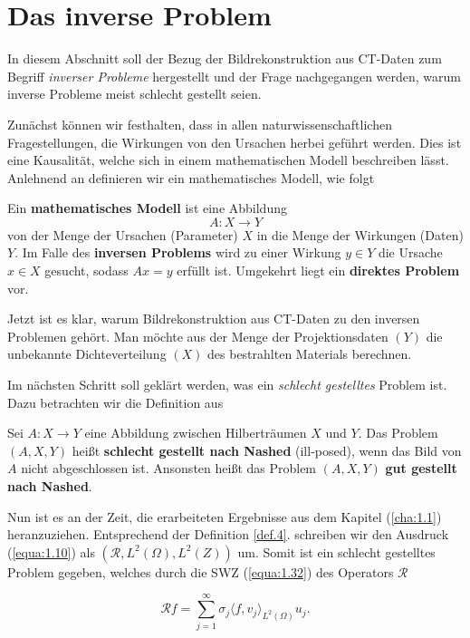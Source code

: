 \chapter{Das inverse Problem}
\label{cha:2}

In diesem Abschnitt soll der Bezug der Bildrekonstruktion aus CT-Daten zum Begriff \textit{inverser Probleme} hergestellt und der Frage nachgegangen werden, warum inverse Probleme meist schlecht gestellt seien. 

Zunächst können wir festhalten, dass in allen naturwissenschaftlichen Fragestellungen, die Wirkungen von den Ursachen herbei geführt werden. Dies ist eine Kausalität, welche sich in einem mathematischen Modell beschreiben lässt. Anlehnend an \cite[S. 14]{Rieder03} definieren wir ein mathematisches Modell, wie folgt

\begin{Definition}
	Ein \textbf{mathematisches Modell} ist eine Abbildung
	\[A: X \rightarrow Y\]
	von der Menge der Ursachen (Parameter) $X$ in die Menge der Wirkungen (Daten) $Y$. Im Falle des \textbf{inversen Problems} wird zu einer Wirkung $y \in Y$ die Ursache $x \in X$ gesucht, sodass $Ax = y$ erfüllt ist. Umgekehrt liegt ein \textbf{direktes Problem} vor.
	\label{def:3}
\end{Definition}
Jetzt ist es klar, warum Bildrekonstruktion aus CT-Daten zu den inversen Problemen gehört. Man möchte aus der Menge der Projektionsdaten $(Y)$ die unbekannte Dichteverteilung $(X)$ des bestrahlten Materials berechnen.

Im nächsten Schritt soll geklärt werden, was ein \textit{schlecht gestelltes} Problem ist. Dazu betrachten wir die Definition aus \cite[S. 24]{Rieder03}
\begin{Definition}
	Sei $A:X \rightarrow Y$ eine Abbildung zwischen Hilberträumen $X$ und $Y$. Das Problem $(A, X, Y)$ heißt \textbf{schlecht gestellt nach Nashed}\cite{Nashed} (ill-posed), wenn das Bild von $A$ nicht abgeschlossen ist. Ansonsten heißt das Problem $(A,X,Y)$ \textbf{gut gestellt nach Nashed}.	
	\label{def.4}
\end{Definition}
Nun ist es an der Zeit, die erarbeiteten Ergebnisse aus dem Kapitel (\ref{cha:1.1}) heranzuziehen. Entsprechend der Definition \ref{def.4}. schreiben wir den Ausdruck (\ref{equa:1.10}) als $(\mathcal{R}, L^2(\Omega), L^2(Z))$ um. Somit ist ein schlecht gestelltes Problem gegeben, welches durch die SWZ (\ref{equa:1.32}) des Operators $\mathcal{R}$
 
\[ \mathcal{R}f = \sum\limits_{j = 1}^{\infty} \sigma_j \langle f, v_j\rangle_{L^2(\Omega)} u_j. \]  

